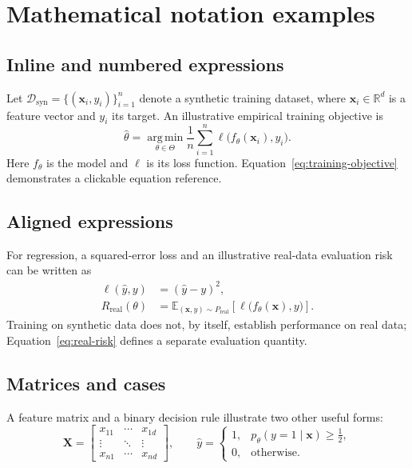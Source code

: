 \section{Mathematical notation examples}
\label{app:mathematics}

\subsection{Inline and numbered expressions}
Let $\mathcal{D}_{\mathrm{syn}}=\{(\bm{x}_i,y_i)\}_{i=1}^{n}$ denote a
synthetic training dataset, where $\bm{x}_i\in\mathbb{R}^{d}$ is a feature
vector and $y_i$ its target. An illustrative empirical training objective is
\begin{equation}
  \hat{\theta}=\operatorname*{arg\,min}_{\theta\in\Theta}
  \frac{1}{n}\sum_{i=1}^{n}\ell\bigl(f_{\theta}(\bm{x}_i),y_i\bigr).
  \label{eq:training-objective}
\end{equation}
Here $f_{\theta}$ is the model and $\ell$ is its loss function.
Equation~\eqref{eq:training-objective} demonstrates a clickable equation reference.

\subsection{Aligned expressions}
For regression, a squared-error loss and an illustrative real-data evaluation
risk can be written as
\begin{align}
  \ell(\hat{y},y)&=(\hat{y}-y)^2, \label{eq:squared-loss}\\
  R_{\mathrm{real}}(\theta)&=
  \mathbb{E}_{(\bm{x},y)\sim P_{\mathrm{real}}}
  \!\left[\ell\bigl(f_{\theta}(\bm{x}),y\bigr)\right].
  \label{eq:real-risk}
\end{align}
Training on synthetic data does not, by itself, establish performance on real
data; Equation~\eqref{eq:real-risk} defines a separate evaluation quantity.

\subsection{Matrices and cases}
A feature matrix and a binary decision rule illustrate two other useful forms:
\[
  \bm{X}=\begin{bmatrix}
    x_{11} & \cdots & x_{1d}\\
    \vdots & \ddots & \vdots\\
    x_{n1} & \cdots & x_{nd}
  \end{bmatrix},
  \qquad
  \hat{y}=\begin{cases}
    1, & p_{\theta}(y=1\mid\bm{x})\geq\tfrac{1}{2},\\
    0, & \text{otherwise}.
  \end{cases}
\]
